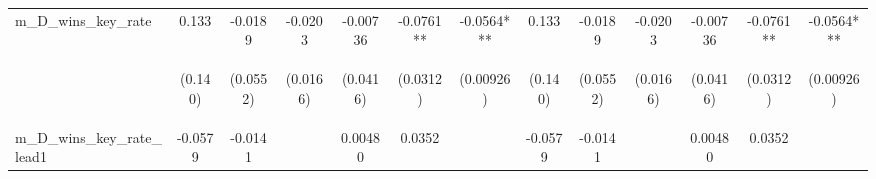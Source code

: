 \documentclass[]{article}
\begin{document}
\begin{center}
\begin{tabular}{lcccccccccccc}
m\_D\_wins\_key\_rate & 0.133 & -0.0189 & -0.0203 & -0.00736 & -0.0761** & -0.0564*** & 0.133 & -0.0189 & -0.0203 & -0.00736 & -0.0761** & -0.0564*** \\
\vspace{4pt} & \begin{footnotesize}(0.140)\end{footnotesize} & \begin{footnotesize}(0.0552)\end{footnotesize} & \begin{footnotesize}(0.0166)\end{footnotesize} & \begin{footnotesize}(0.0416)\end{footnotesize} & \begin{footnotesize}(0.0312)\end{footnotesize} & \begin{footnotesize}(0.00926)\end{footnotesize} & \begin{footnotesize}(0.140)\end{footnotesize} & \begin{footnotesize}(0.0552)\end{footnotesize} & \begin{footnotesize}(0.0166)\end{footnotesize} & \begin{footnotesize}(0.0416)\end{footnotesize} & \begin{footnotesize}(0.0312)\end{footnotesize} & \begin{footnotesize}(0.00926)\end{footnotesize} \\
m\_D\_wins\_key\_rate\_lead1 & -0.0579 & -0.0141 &  & 0.00480 & 0.0352 &  & -0.0579 & -0.0141 &  & 0.00480 & 0.0352 &  \\

\end{tabular}
\end{center}
\end{document}

